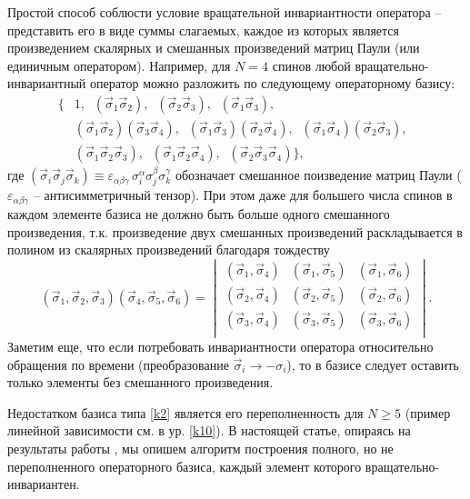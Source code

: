 \documentclass[]{article}
\renewcommand{\[}{\begin{equation}}
\renewcommand{\]}{\end{equation}}
\begin{document}
Простой способ соблюсти условие вращательной инвариантности оператора -- представить его в виде суммы слагаемых, каждое из которых является произведением скалярных и смешанных произведений матриц Паули (или единичным оператором). Например, для $N=4$ спинов любой вращательно-инвариантный оператор можно разложить по следующему операторному базису:
\begin{align}
\{ & 1,  \;\;({\vec \sigma}_1{\vec\sigma}_2), \;\; ({\vec \sigma}_2{\vec\sigma}_3), \;\;({\vec \sigma}_1{\vec\sigma}_3),\nonumber\\
&({\vec \sigma}_1{\vec\sigma}_2)({\vec \sigma}_3{\vec\sigma}_4),\;\;({\vec \sigma}_1{\vec\sigma}_3)({\vec \sigma}_2{\vec\sigma}_4),\;\;
({\vec \sigma}_1{\vec\sigma}_4)({\vec \sigma}_2{\vec\sigma}_3),\;\; \nonumber \\
&({\vec \sigma}_1{\vec\sigma}_2{\vec\sigma}_3),\;\;({\vec \sigma}_1{\vec\sigma}_2{\vec\sigma}_4),\;\;({\vec \sigma}_2{\vec\sigma}_3{\vec\sigma}_4)
\},
\label{k2}
\end{align}
где $({\vec \sigma}_i{\vec\sigma}_j{\vec\sigma}_k)\equiv \varepsilon_{\alpha \beta \gamma} \, \sigma_i^\alpha \sigma_j^\beta \sigma_k^\gamma$ обозначает смешанное поизведение матриц Паули ($ \varepsilon_{\alpha \beta \gamma}$  -- антисимметричный тензор).
При этом даже для большего числа спинов в каждом элементе базиса не должно быть больше одного смешанного произведения, т.к. произведение двух смешанных произведений раскладывается в полином из скалярных произведений благодаря тождеству
\[
(\vec\sigma_1,\vec\sigma_2,\vec\sigma_3)
(\vec\sigma_4,\vec\sigma_5,\vec\sigma_6)=
\begin{vmatrix}
	(\vec\sigma_1,\vec\sigma_4) & 	(\vec\sigma_1,\vec\sigma_5) & (\vec\sigma_1,\vec\sigma_6) \\
	(\vec\sigma_2,\vec\sigma_4) & 	(\vec\sigma_2,\vec\sigma_5) & (\vec\sigma_2,\vec\sigma_6) \\
	(\vec\sigma_3,\vec\sigma_4) & 	(\vec\sigma_3,\vec\sigma_5) & (\vec\sigma_3,\vec\sigma_6) \\
\end{vmatrix}.
\label{k3}
\]
Заметим еще, что если потребовать инвариантности оператора относительно обращения по времени (преобразование $\vec\sigma_i\rightarrow -\sigma_i$), то в базисе следует оставить только элементы без смешанного произведения.


Недостатком базиса типа \eqref{k2} является его переполненность для $N\geq 5$ \cite{variational}(пример линейной зависимости см. в ур. \eqref{k10}).
В настоящей статье, опираясь на результаты работы \cite{sourceArticle}, мы опишем алгоритм построения полного, но не переполненного операторного базиса, каждый элемент которого вращательно-инвариантен.
\end{document}
